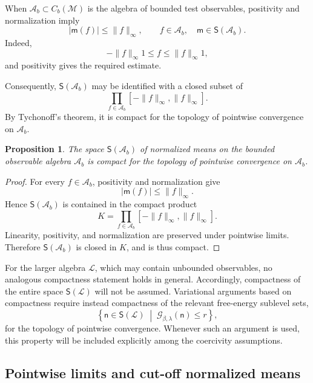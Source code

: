 \documentclass[10pt,a4paper]{amsart}
\newtheorem{Proposition}[Theorem]{Proposition}
\begin{document}
When $\mathcal A_b\subset C_b(\mathcal M)$ is the algebra of bounded
test observables, positivity and normalization imply
\[
\left|\mathsf m(f)\right|
\leq
\|f\|_\infty,
\qquad
f\in\mathcal A_b,
\quad
\mathsf m\in\mathsf S(\mathcal A_b).
\]
Indeed,
\[
-\|f\|_\infty 1
\leq
f
\leq
\|f\|_\infty 1,
\]
and positivity gives the required estimate.

Consequently, $\mathsf S(\mathcal A_b)$ may be identified with a closed
subset of
\[
\prod_{f\in\mathcal A_b}
[-\|f\|_\infty,\|f\|_\infty].
\]
By Tychonoff's theorem, it is compact for the topology of pointwise
convergence on $\mathcal A_b$.

\begin{Proposition}
\label{prop:compact-bounded-states}
The space $\mathsf S(\mathcal A_b)$ of normalized means on the bounded
observable algebra $\mathcal A_b$ is compact for the topology of
pointwise convergence on $\mathcal A_b$.
\end{Proposition}

\begin{proof}
For every $f\in\mathcal A_b$, positivity and normalization give
\[
|\mathsf m(f)|\leq\|f\|_\infty.
\]
Hence $\mathsf S(\mathcal A_b)$ is contained in the compact product
\[
K
=
\prod_{f\in\mathcal A_b}
[-\|f\|_\infty,\|f\|_\infty].
\]
Linearity, positivity, and normalization are preserved under pointwise
limits. Therefore $\mathsf S(\mathcal A_b)$ is closed in $K$, and is
thus compact.
\end{proof}

For the larger algebra $\mathcal L$, which may contain unbounded
observables, no analogous compactness statement holds in general.
Accordingly, compactness of the entire space $\mathsf S(\mathcal L)$
will not be assumed. Variational arguments based on compactness require
instead compactness of the relevant free-energy sublevel sets,
\[
\left\{
\mathsf n\in\mathsf S(\mathcal L)
\;\middle|\;
\mathcal G_{\beta,\lambda}(\mathsf n)\leq r
\right\},
\]
for the topology of pointwise convergence. Whenever such an argument is
used, this property will be included explicitly among the coercivity
assumptions.

\subsection{Pointwise limits and cut-off normalized means}
\label{subsec:cutoff-limits}
\end{document}
